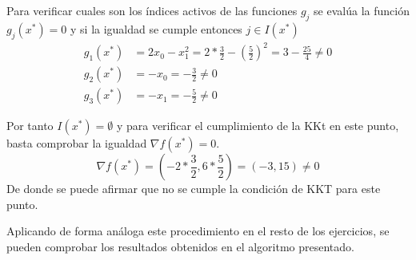 \documentclass[titlepage, 11pt]{scrartcl}
\begin{document}
Para verificar cuales son los \'indices activos de las funciones $g_j$ se eval\'ua la funci\'on $g_j(x^*) = 0$ y si la igualdad se cumple entonces $j \in I(x^*)$
\begin{align*}
	g_1(x^*) &= 2x_0 - x_1^2 = 2 * \frac{3}{2} - (\frac{5}{2})^2 = 3 - \frac{25}{4} \neq 0\\
	g_2(x^*) &= -x_0 = - \frac{3}{2} \neq 0\\
	g_3(x^*) &= -x_1 = - \frac{5}{2} \neq 0
\end{align*}

Por tanto $I(x^*)  = \emptyset$  y para verificar el cumplimiento de la KKt en este punto, basta comprobar la igualdad $\nabla f(x^*) = 0$. 
\begin{equation*}
	\nabla f(x^*) = (-2 * \frac{3}{2}, 6 * \frac{5}{2}) = (-3, 15) \neq 0
\end{equation*}
De donde se puede afirmar que no se cumple la condición de KKT para este punto.

Aplicando de forma an\'aloga este procedimiento en el resto de los ejercicios, se pueden comprobar los resultados obtenidos en el algoritmo presentado.
\end{document}
